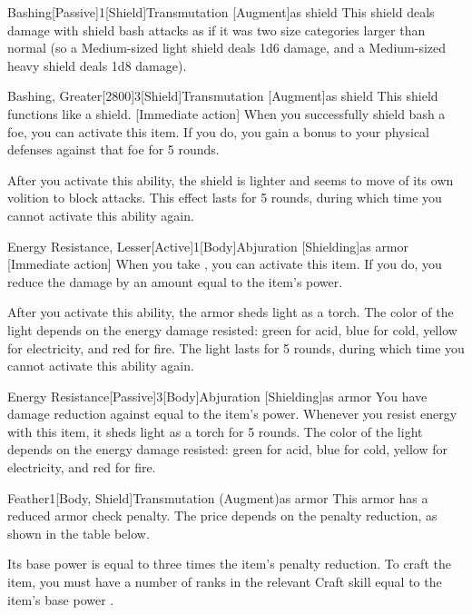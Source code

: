 \begin{magicitemdef}{Bashing}[Passive]{1}[Shield]{Transmutation [Augment]}{as shield}
     This shield deals damage with shield bash attacks as if it was two size categories larger than normal (so a Medium-sized light shield deals 1d6 damage, and a Medium-sized heavy shield deals 1d8 damage).
\end{magicitemdef}

\begin{magicitemdef}{Bashing, Greater}[2800]{3}[Shield]{Transmutation [Augment]}{as shield}
     This shield functions like a  shield.
    [Immediate action] When you successfully shield bash a foe, you can activate this item. If you do, you gain a  bonus to your physical defenses against that foe for 5 rounds.

    After you activate this ability, the shield is lighter and seems to move of its own volition to block attacks.
    This effect lasts for 5 rounds, during which time you cannot activate this ability again.
\end{magicitemdef}

\begin{magicitemdef}{Energy Resistance, Lesser}[Active]{1}[Body]{Abjuration [Shielding]}{as armor}
    [Immediate action] When you take , you can activate this item. If you do, you reduce the damage by an amount equal to the item's power.

    After you activate this ability, the armor sheds light as a torch.
    The color of the light depends on the energy damage resisted: green for acid, blue for cold, yellow for electricity, and red for fire.
    The light lasts for 5 rounds, during which time you cannot activate this ability again.
\end{magicitemdef}

\begin{magicitemdef}{Energy Resistance}[Passive]{3}[Body]{Abjuration [Shielding]}{as armor}
     You have damage reduction against  equal to the item's power.
    Whenever you resist energy with this item, it sheds light as a torch for 5 rounds.
    The color of the light depends on the energy damage resisted: green for acid, blue for cold, yellow for electricity, and red for fire.
\end{magicitemdef}

\begin{magicitemdef}{Feather}{1}[Body, Shield]{Transmutation (Augment)}{as armor}
     This armor has a reduced armor check penalty.
    The price depends on the penalty reduction, as shown in the table below.

    Its base power is equal to three times the item's penalty reduction.
    To craft the item, you must have a number of ranks in the relevant Craft skill equal to the item's base power .
\end{magicitemdef}

